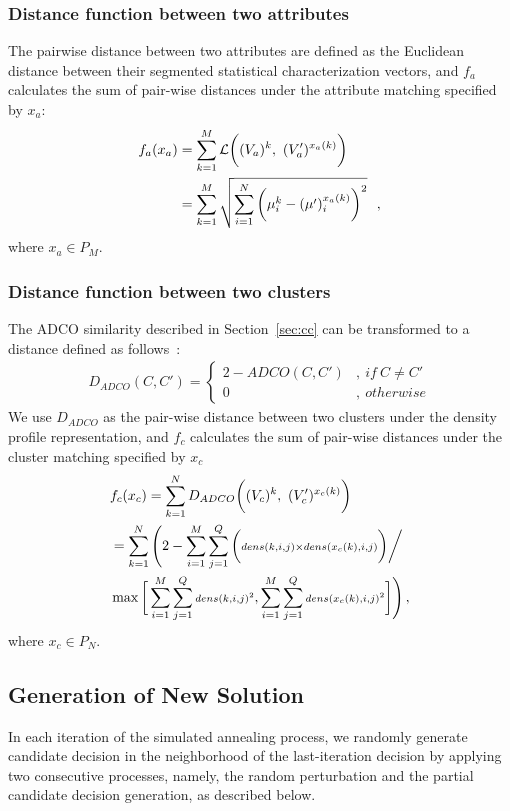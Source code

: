 \subsubsection{Distance function between two attributes}
The pairwise distance between two attributes are defined as the Euclidean distance between their segmented statistical characterization vectors, and $f_a$ calculates the sum of pair-wise distances under the attribute matching specified by $x_a$:
\begin{align}
\notag f_a(x_a)&=\sum_{k=1}^M\mathcal{L}\bigg((V_a)^k,~(V_a')^{x_a(k)}\bigg)\\
&=\sum_{k=1}^M\sqrt{\sum_{i=1}^N\bigg(\mu^{k}_i-(\mu')^{x_a(k)}_i\bigg)^2} \label{eq:calc_L_mm} ~~ ,
\end{align}
where $x_a \in P_M$.

\subsubsection{Distance function between two clusters}

The ADCO similarity described in Section~\ref{sec:cc} can be transformed to a distance defined as follows~\cite{Bae2010}:
\begin{align}
D_{ADCO}(C,C')=\left\{\begin{array}{ll}
	   {\scriptstyle 2-ADCO(C,C')} &, {\scriptstyle ~if~ C \neq C'}\\
	   {\scriptstyle 0} &, ~{\scriptstyle otherwise}
	   \end{array}\right.
\end{align}
We use $D_{ADCO}$ as the pair-wise distance between two clusters under the density profile representation, and $f_c$ calculates the sum of pair-wise distances under the cluster matching specified by $x_c$
\begin{align}
\notag &f_c(x_c)=\sum_{k=1}^N D_{ADCO} \bigg((V_c)^k,~(V_c')^{x_c(k)}\bigg)\\
\notag &=\sum_{k=1}^N\Bigg(2- \sum_{i=1}^M\sum_{j=1}^Q\bigg({\scriptstyle dens(k,i,j)\times dens(x_c(k),i,j)\bigg) \bigg/ }\\ &\max{\bigg[\sum_{i=1}^M\sum_{j=1}^Q {\scriptstyle dens(k,i,j)^2},\sum_{i=1}^M\sum_{j=1}^Q {\scriptstyle dens(x_c(k),i,j)^2}\bigg]}\Bigg) \label{eq:calc_L_mm} \, ,
\end{align}
where $x_c \in P_N$.

\subsection{Generation of New Solution}
In each iteration of the simulated annealing process, we randomly generate candidate decision in the neighborhood of the last-iteration decision by applying two consecutive processes, namely, the random perturbation and the partial candidate decision generation, as described below.
